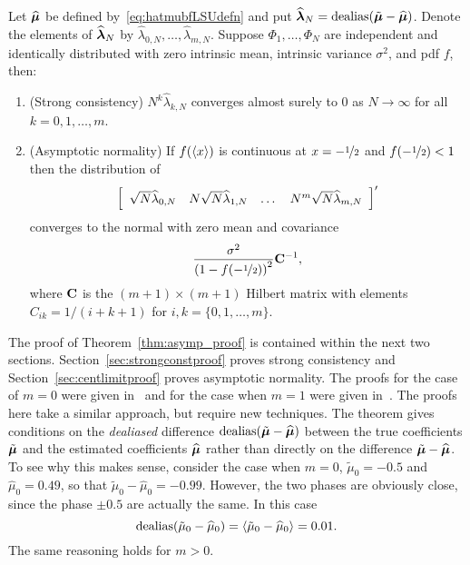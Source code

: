 \documentclass[journal]{IEEEtran}
\begin{document}
\begin{theorem} \label{thm:asymp_proof} 
Let $\widehat{\boldsymbol{\mu}}$ be defined by~\eqref{eq:hatmubfLSUdefn} and put $\widehat{\boldsymbol{\lambda}}_N = \operatorname{dealias}(\tilde{\boldsymbol{\mu}} - \widehat{\boldsymbol{\mu}})$.  Denote the elements of $\widehat{\boldsymbol{\lambda}}_N$ by $\widehat{\lambda}_{0,N}, \dots, \widehat{\lambda}_{m,N}$.  Suppose $\Phi_1, \dots, \Phi_N$ are independent and identically distributed with zero intrinsic mean, intrinsic variance $\sigma^2$, and pdf $f$, then: 
\begin{enumerate}
\item (Strong consistency) $N^k \widehat{\lambda}_{k,N}$ converges almost surely to $0$ as $N\rightarrow\infty$ for all $k = 0, 1, \dots, m$.
\item (Asymptotic normality) If $f(\left\langle x \right\rangle)$ is continuous at $x = -\nicefrac{1}{2}$ and $f(-\nicefrac{1}{2}) < 1$ then the distribution of
\[
\left[
\begin{array}
[c]{cccc}%
\sqrt{N} \widehat{\lambda}_{0,N} & N \sqrt{N}\widehat{\lambda}_{1,N}  & \dots & N^m\sqrt{N} \widehat{\lambda}_{m,N}
\end{array}
\right]^\prime
\]
converges to the normal with zero mean and covariance
\[
\frac{\sigma^2}{\left(1-f( -\nicefrac{1}{2}) \right)^{2}} \mathbf{C}^{-1},
\]
where $\mathbf{C}$ is the $(m+1)\times (m+1)$ Hilbert matrix with elements $C_{ik} = 1/(i + k + 1)$ for $i,k = \{0, 1, \dots, m\}$.
\end{enumerate}
\end{theorem}
The proof of Theorem~\ref{thm:asymp_proof} is contained within the next two sections. Section~\ref{sec:strongconstproof} proves strong consistency and Section~\ref{sec:centlimitproof} proves asymptotic normality.  The proofs for the case of $m=0$ were given in~\cite{McKilliam_mean_dir_est_sq_arc_length2010} and for the case when $m=1$ were given in~\cite{McKilliamFrequencyEstimationByPhaseUnwrapping2009}.  The proofs here take a similar approach, but require new techniques.  %
The theorem gives conditions on the \emph{dealiased} difference $\operatorname{dealias}(\tilde{\boldsymbol{\mu}} - \widehat{\boldsymbol{\mu}})$ between the true coefficients $\tilde{\boldsymbol{\mu}}$ and the estimated coefficients $\widehat{\boldsymbol{\mu}}$ rather than directly on the difference $\tilde{\boldsymbol{\mu}} - \widehat{\boldsymbol{\mu}}$.   To see why this makes sense, consider the case when $m=0$, $\tilde{\mu}_0 = -0.5$ and $\widehat{\mu}_0 = 0.49$, so that $\tilde{\mu}_0 - \widehat{\mu}_0 = -0.99$.  However, the two phases are obviously close, since the phase $\pm 0.5$ are actually the same.  In this case 
\[
\operatorname{dealias}(\tilde{\mu}_0 - \widehat{\mu}_0) = \left\langle \tilde{\mu}_0 - \widehat{\mu}_0 \right\rangle = 0.01.
\] 
The same reasoning holds for $m > 0$.
\end{document}
